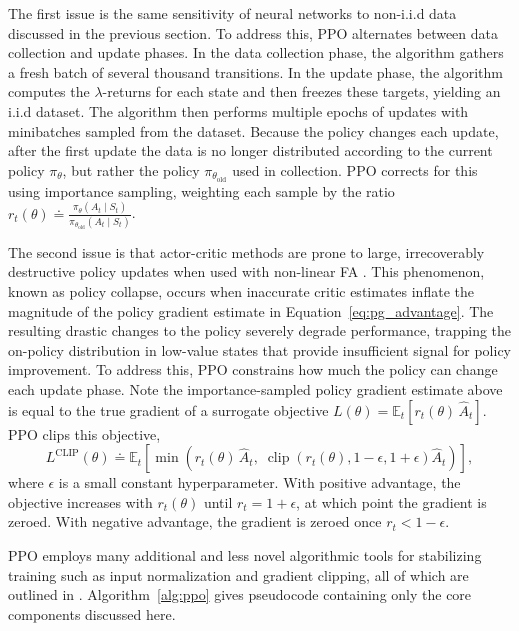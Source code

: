 The first issue is the same sensitivity of neural networks to non-i.i.d data discussed in the previous section. To address this, PPO alternates between data collection and update phases. In the data collection phase, the algorithm gathers a fresh batch of several thousand transitions. In the update phase, the algorithm computes the $\lambda$-returns for each state and then freezes these targets, yielding an i.i.d dataset. The algorithm then performs multiple epochs of updates with minibatches sampled from the dataset. Because the policy changes each update, after the first update the data is no longer distributed according to the current policy $\pi_\theta$, but rather the policy $\pi_{\theta_{\text{old}}}$ used in collection. PPO corrects for this using importance sampling, weighting each sample by the ratio $r_t(\theta) \doteq \frac{\pi_\theta(A_t \mid S_t)}{\pi_{\theta_{\text{old}}}(A_t \mid S_t)}$.

The second issue is that actor-critic methods are prone to large, irrecoverably destructive policy updates when used with non-linear FA . This phenomenon, known as policy collapse, occurs when inaccurate critic estimates inflate the magnitude of the policy gradient estimate in Equation~\eqref{eq:pg_advantage}. The resulting drastic changes to the policy severely degrade performance, trapping the on-policy distribution in low-value states that provide insufficient signal for policy improvement. To address this, PPO constrains how much the policy can change each update phase. Note the importance-sampled policy gradient estimate above is equal to the true gradient of a surrogate objective $L(\theta) = \mathbb{E}_t\!\left[ r_t(\theta)\, \hat{A}_t \right]$. PPO clips this objective,
\begin{equation}
L^{\text{CLIP}}(\theta) \doteq \mathbb{E}_t\!\left[ \min\!\left( r_t(\theta)\,\hat{A}_t,\; \operatorname{clip}\!\left(r_t(\theta), 1-\epsilon, 1+\epsilon\right)\hat{A}_t \right) \right],
\end{equation}
where $\epsilon$ is a small constant hyperparameter. With positive advantage, the objective increases with $r_t(\theta)$ until $r_t = 1+\epsilon$, at which point the gradient is zeroed. With negative advantage, the gradient is zeroed once $r_t < 1-\epsilon$.

PPO employs many additional and less novel algorithmic tools for stabilizing training such as input normalization and gradient clipping, all of which are outlined in . Algorithm~\ref{alg:ppo} gives pseudocode containing only the core components discussed here.

